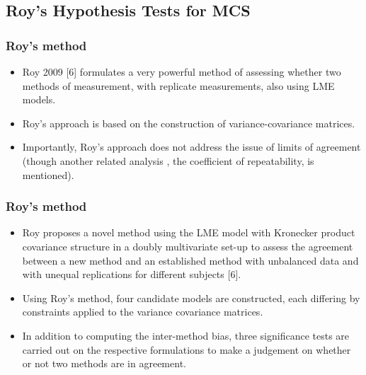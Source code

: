 \documentclass[compress]{beamer}        %
\begin{document}
\subsection{Roy's Hypothesis Tests for MCS}
\begin{frame}
\frametitle{Roy's method}
\large
\begin{itemize}
\item Roy 2009 [6] formulates a very powerful method of assessing whether two methods of measurement, with replicate measurements, also using LME models.
\item  Roy's approach is based on the construction of variance-covariance matrices.
\item Importantly, Roy's approach does not address the issue of limits of agreement (though another related analysis , the coefficient of repeatability, is mentioned).
\end{itemize}


\end{frame}
\begin{frame}
\frametitle{Roy's method}
\begin{itemize}
\item Roy proposes a novel method using the LME model with Kronecker product covariance structure in a doubly multivariate set-up to assess the agreement between a new method and an established method with unbalanced data and with unequal replications for different subjects [6].
\item 
Using Roy's method, four candidate models are constructed, each differing by constraints applied to the variance covariance matrices.
\item In addition to computing the inter-method bias, three significance tests are carried out on the respective formulations to make a judgement on whether or not two methods are in agreement.
\end{itemize}
\end{frame}
\end{document}
